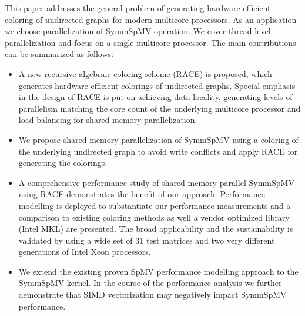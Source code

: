 

This paper addresses the general problem of generating hardware efficient \DK coloring
 of undirected graphs for modern multicore processors. As an application we 
 choose parallelization of \acrshort{SymmSpMV} operation. We cover thread-level 
 parallelization and focus on a single multicore processor. The main contributions
  can be summarized as follows: 
\begin{itemize}
\item A new recursive algebraic coloring scheme (RACE) is proposed, 
which generates hardware efficient \DK colorings of undirected graphs. 
Special emphasis in the design of RACE is put on achieving data locality, 
generating levels of parallelism matching the core count of the underlying 
multicore processor and load balancing for shared memory parallelization.
\item We propose shared memory parallelization of \acrshort{SymmSpMV}  
using a \DTWO coloring of the underlying undirected graph to avoid
 write conflicts and apply RACE for generating the colorings.
\item A comprehensive performance study of shared memory parallel \acrshort{SymmSpMV} 
using RACE demonstrates the benefit of our approach. Performance modelling
 is deployed to substantiate our performance measurements and a comparison to
  existing coloring methods as well a vendor optimized library (Intel MKL) 
  are presented. The broad applicability and the sustainability is validated 
  by using a wide set of 31 test matrices and two very different generations 
  of Intel Xeon processors.
\item We extend the existing proven \acrshort{SpMV} performance modelling approach
 to the \acrshort{SymmSpMV} kernel. In the course of the performance analysis we
 further demonstrate that SIMD vectorization may negatively impact \acrshort{SymmSpMV}
 performance. 

\end{itemize}
